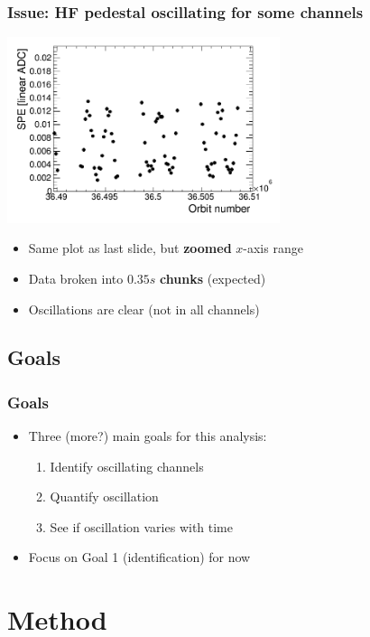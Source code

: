 \documentclass[bigger]{beamer}
\providecommand{\alert}[1]{\textbf{#1}}
\begin{document}
\begin{frame}
\frametitle{Issue: HF pedestal oscillating for some channels}
\label{sec-1-1-2}
\label{sec-1-1-2-1}

\centering
\includegraphics[width=0.6\textwidth]{fig/SPE_vs_ORN_zoomed.png}
\begin{itemize}

\item Same plot as last slide, but \alert{zoomed} $x$-axis range
\label{sec-1-1-2-2}%

\item Data broken into $0.35 s$ \alert{chunks} (expected)
\label{sec-1-1-2-3}%

\item Oscillations are clear (not in all channels)
\label{sec-1-1-2-4}%
\end{itemize} %
\end{frame}
\subsection{Goals}
\label{sec-1-2}
\begin{frame}
\frametitle{Goals}
\label{sec-1-2-1}
\begin{itemize}

\item Three (more?) main goals for this analysis:
\label{sec-1-2-1-1}%
\begin{enumerate}
\item Identify oscillating channels
\item Quantify oscillation
\item See if oscillation varies with time
\end{enumerate}

\item Focus on Goal 1 (identification) for now
\label{sec-1-2-1-2}%
\end{itemize} %
\end{frame}
\section{Method}
\label{sec-2}
\end{document}
